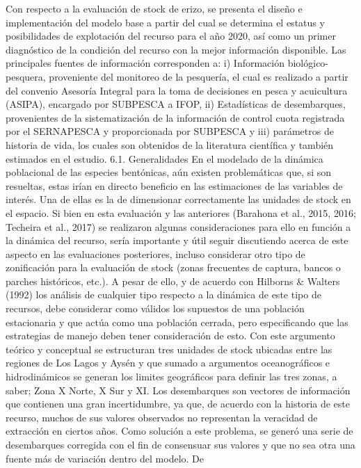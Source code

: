 \documentclass[
]{article}
\begin{document}
Con respecto a la evaluación de stock de erizo, se presenta el diseño e
implementación del modelo base a partir del cual se determina el estatus
y posibilidades de explotación del recurso para el año 2020, así como un
primer diagnóstico de la condición del recurso con la mejor información
disponible. Las principales fuentes de información corresponden a: i)
Información biológico-pesquera, proveniente del monitoreo de la
pesquería, el cual es realizado a partir del convenio Asesoría Integral
para la toma de decisiones en pesca y acuicultura (ASIPA), encargado por
SUBPESCA a IFOP, ii) Estadísticas de desembarques, provenientes de la
sistematización de la información de control cuota registrada por el
SERNAPESCA y proporcionada por SUBPESCA y iii) parámetros de historia de
vida, los cuales son obtenidos de la literatura científica y también
estimados en el estudio. 6.1. Generalidades En el modelado de la
dinámica poblacional de las especies bentónicas, aún existen
problemáticas que, si son resueltas, estas irían en directo beneficio en
las estimaciones de las variables de interés. Una de ellas es la de
dimensionar correctamente las unidades de stock en el espacio. Si bien
en esta evaluación y las anteriores (Barahona et al., 2015, 2016;
Techeira et al., 2017) se realizaron algunas consideraciones para ello
en función a la dinámica del recurso, sería importante y útil seguir
discutiendo acerca de este aspecto en las evaluaciones posteriores,
incluso considerar otro tipo de zonificación para la evaluación de stock
(zonas frecuentes de captura, bancos o parches históricos, etc.). A
pesar de ello, y de acuerdo con Hilborns \& Walters (1992) los análisis
de cualquier tipo respecto a la dinámica de este tipo de recursos, debe
considerar como válidos los supuestos de una población estacionaria y
que actúa como una población cerrada, pero especificando que las
estrategias de manejo deben tener consideración de esto. Con este
argumento teórico y conceptual se estructuran tres unidades de stock
ubicadas entre las regiones de Los Lagos y Aysén y que sumado a
argumentos oceanográficos e hidrodinámicos se generan los limites
geográficos para definir las tres zonas, a saber; Zona X Norte, X Sur y
XI. Los desembarques son vectores de información que contienen una gran
incertidumbre, ya que, de acuerdo con la historia de este recurso,
muchos de sus valores observados no representan la veracidad de
extracción en ciertos años. Como solución a este problema, se generó una
serie de desembarques corregida con el fin de consensuar sus valores y
que no sea otra una fuente más de variación dentro del modelo. De
\end{document}
